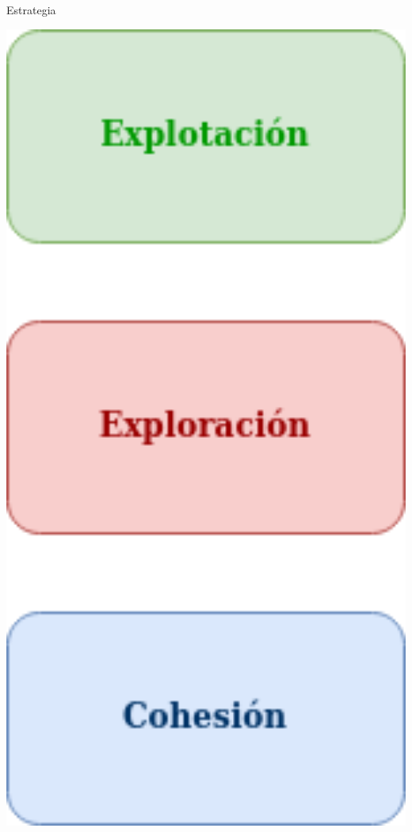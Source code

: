 \documentclass[
  24pt, %
  aspectratio=169, %
]{beamer}
\begin{document}
\begin{frame}{Estrategia}
\begin{minipage}{0.2\textwidth}
    \includegraphics[width=1\textwidth]{estrategia}
  \end{minipage}
  
\end{frame}
\end{document}
